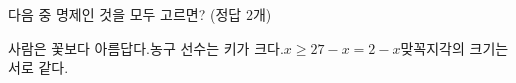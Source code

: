 다음 중 명제인 것을 모두 고르면? (정답 $2$개)
\begin{choicesii}{사람은 꽃보다 아름답다.}{농구 선수는 키가 크다.}{$x\ge 2$}{$7-x=2-x$}{맞꼭지각의 크기는 서로 같다.}\end{choicesii}
